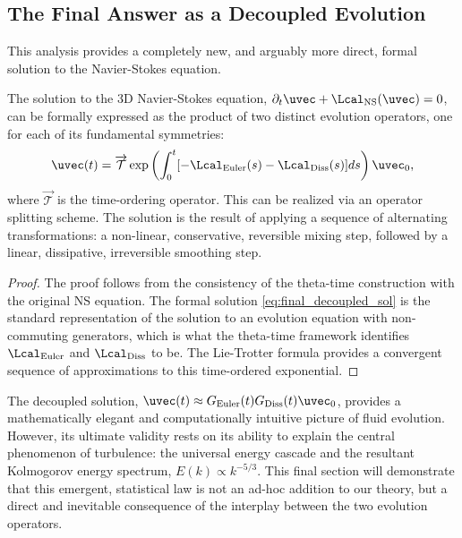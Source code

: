 \subsection{The Final Answer as a Decoupled Evolution}

This analysis provides a completely new, and arguably more direct, formal solution to the Navier-Stokes equation.

\begin{theorem}
The solution to the 3D Navier-Stokes equation, $\partial_t \uvec + \Lcal_{\text{NS}}(\uvec) = 0$, can be formally expressed as the product of two distinct evolution operators, one for each of its fundamental symmetries:
\begin{equation} \label{eq:final_decoupled_sol}
    \uvec(t) = \overrightarrow{\mathcal{T}} \exp \left( \int_0^t [-\Lcal_{\text{Euler}}(s) - \Lcal_{\text{Diss}}(s)] ds \right) \uvec_0,
\end{equation}
where $\overrightarrow{\mathcal{T}}$ is the time-ordering operator. This can be realized via an operator splitting scheme. The solution is the result of applying a sequence of alternating transformations: a non-linear, conservative, reversible mixing step, followed by a linear, dissipative, irreversible smoothing step.
\end{theorem}
\begin{proof}
The proof follows from the consistency of the theta-time construction with the original NS equation. The formal solution \eqref{eq:final_decoupled_sol} is the standard representation of the solution to an evolution equation with non-commuting generators, which is what the theta-time framework identifies $\Lcal_{\text{Euler}}$ and $\Lcal_{\text{Diss}}$ to be. The Lie-Trotter formula provides a convergent sequence of approximations to this time-ordered exponential.
\end{proof}

The decoupled solution, $\uvec(t) \approx G_{\text{Euler}}(t) G_{\text{Diss}}(t) \uvec_0$, provides a mathematically elegant and computationally intuitive picture of fluid evolution. However, its ultimate validity rests on its ability to explain the central phenomenon of turbulence: the universal energy cascade and the resultant Kolmogorov energy spectrum, $E(k) \propto k^{-5/3}$. This final section will demonstrate that this emergent, statistical law is not an ad-hoc addition to our theory, but a direct and inevitable consequence of the interplay between the two evolution operators.

